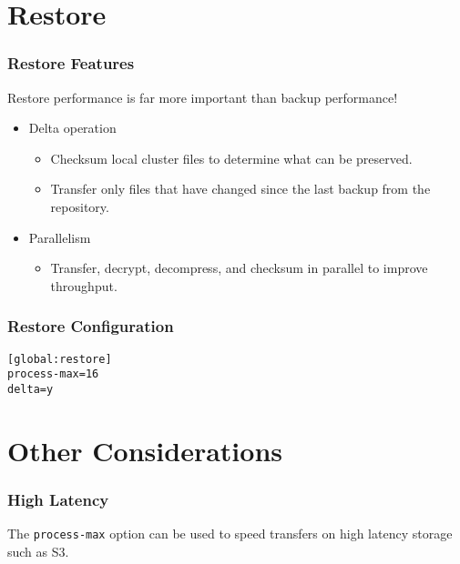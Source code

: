 \section{Restore}

\begin{frame}
    \frametitle{Restore Features}

    Restore performance is far more important than backup performance!\pause

    \begin{itemize}
        \item Delta operation

        \begin{itemize}
            \item Checksum local cluster files to determine what can be preserved.\pause
            \item Transfer only files that have changed since the last backup from the repository.\pause
        \end{itemize}

        \item Parallelism

        \begin{itemize}
            \item Transfer, decrypt, decompress, and checksum in parallel to improve throughput.
        \end{itemize}
    \end{itemize}
\end{frame}

\begin{frame}[fragile]
    \frametitle{Restore Configuration}

    \vspace{.75em}\begin{lstlisting}[title=pgbackrest.conf]
[global:restore]
process-max=16
delta=y
    \end{lstlisting}\vspace{1em}
\end{frame}

\section{Other Considerations}

\begin{frame}
    \frametitle{High Latency}

    The \texttt{process-max} option can be used to speed transfers on high latency storage such as S3.
\end{frame}

